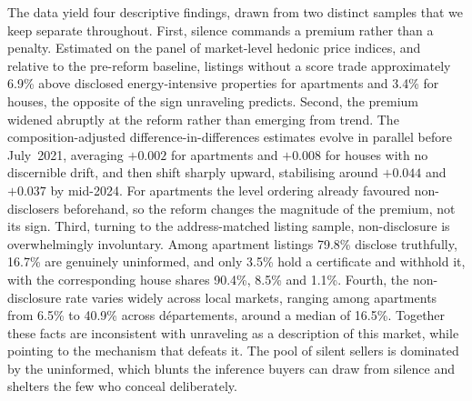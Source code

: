 The data yield four descriptive findings, drawn from two distinct samples that we keep separate
throughout. First, silence commands a premium rather than a penalty. Estimated on the panel of
market-level hedonic price indices, and relative to the pre-reform baseline, listings without a
score trade approximately 6.9\% above disclosed energy-intensive properties for apartments and
3.4\% for houses, the opposite of the sign unraveling predicts. Second, the premium widened
abruptly at the reform rather than emerging from trend. The composition-adjusted
difference-in-differences estimates evolve in parallel before July~2021, averaging $+0.002$ for
apartments and $+0.008$ for houses with no discernible drift, and then shift sharply upward,
stabilising around $+0.044$ and $+0.037$ by mid-2024. For apartments the level ordering already
favoured non-disclosers beforehand, so the reform changes the magnitude of the premium, not its sign. Third, turning to the address-matched listing sample, non-disclosure is
overwhelmingly involuntary. Among apartment listings 79.8\% disclose truthfully, 16.7\% are
genuinely uninformed, and only 3.5\% hold a certificate and withhold it, with the corresponding
house shares 90.4\%, 8.5\% and 1.1\%.
Fourth, the non-disclosure rate varies widely across local markets, ranging among
apartments from 6.5\% to 40.9\% across d\'epartements, around a median of 16.5\%. Together
these facts are inconsistent with unraveling as a description of this market, while pointing to
the mechanism that defeats it. The pool of silent sellers is dominated by the uninformed, which
blunts the inference buyers can draw from silence and shelters the few who conceal
deliberately.
